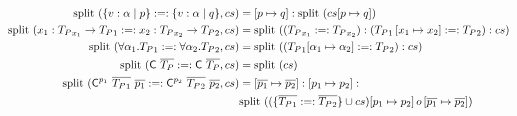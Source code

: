 \documentclass[10pt,a4paper]{article}
\begin{document}
\hfill{}



\hfill{}

\begin{align*}
 \text{split}\ ({\left\lbrace v : \alpha\mid p\right\rbrace :=: \left\lbrace v : \alpha\mid q\right\rbrace} , cs)  &=  \left[ p \mapsto q \right] : \text{split}\ (cs{ \left[ p \mapsto q \right] }) \\
 \text{split}\ ({x_1 : {T_P}_{x_1} \rightarrow {T_P}_1 :=: x_2 : {T_P}_{x_2} \rightarrow {T_P}_2} , cs)  &= 
	 \text{split}\ (({T_P}_{x_1}:=:{T_P}_{x_2}):({T_P}_1 \left[ x_1 \mapsto x_2 \right]  :=: {T_P}_2):cs) \\
 \text{split}\ ({\forall \alpha_1 . {T_P}_1 :=: \forall \alpha_2 . {T_P}_2} , cs)  
	&=  \text{split}\ (({T_P}_1{ \left[ \alpha_1 \mapsto \alpha_2 \right] } :=: {T_P}_2):cs) \\
 \text{split}\ ({\mathsf{\mathsf{C}} \ \overline{{T_P}} :=: \mathsf{\mathsf{C}} \ \overline{{T_P}}} , cs)  
	&=  \text{split}\ (cs) \\
 \text{split}\ (	\mathsf{\mathsf{C}} ^{p_1} \ \overline{{T_P}_1} \ \overline{p_1} :=: 
		 	\mathsf{\mathsf{C}} ^{p_2} \ \overline{{T_P}_2} \ \overline{p_2} , cs)  
	&=  \left[ \overline{p_1} \mapsto \overline{p_2} \right]  :  \left[ p_1 \mapsto p_2 \right] :\\
	& \text{split}\ ( (\{ \overline{{T_P}_1} :=: \overline{{T_P}_2} \} \cup cs) { \left[ p_1 \mapsto p_2 \right]  o  \left[ \overline{p_1} \mapsto \overline{p_2} \right] }) \\
\end{align*}
\end{document}
